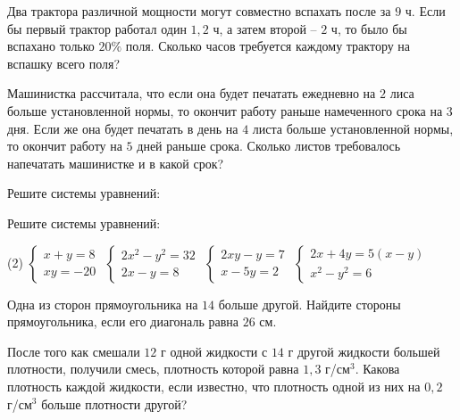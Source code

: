 \begin{class}[number=6]
\begin{listofex}
		\item Два трактора различной мощности могут совместно вспахать после за \(9\) ч. Если бы первый трактор работал один \(1,2\) ч, а затем второй -- \(2\) ч, то было бы вспахано только \(20\%\) поля. Сколько часов требуется каждому трактору на вспашку всего поля?
		\item Машинистка рассчитала, что если она будет печатать ежедневно на \(2\) лиса больше установленной нормы, то окончит работу раньше намеченного срока на \(3\) дня. Если же она будет печатать в день на \(4\) листа больше установленной нормы, то окончит работу на \(5\) дней раньше срока. Сколько листов требовалось напечатать машинистке и в какой срок?
	\end{listofex}
\end{class}

\begin{homework}[number=3]
	\begin{listofex}
		\item Решите системы уравнений:
		\begin{itasks}[2]
			\task {}
			\task {}
			\task {}
			\task {}
		\end{itasks}
		\item Решите системы уравнений:
		\begin{tasks}(2)
			\task \( \left\{
			\begin{array}{l}
				x+y=8\\
				xy=-20
			\end{array}
			\right. \)
			\task \( \left\{
			\begin{array}{l}
				2x^2-y^2=32\\
				2x-y=8
			\end{array}
			\right. \)
			\task \( \left\{
			\begin{array}{l}
				2xy-y=7\\
				x-5y=2
			\end{array}
			\right. \)
			\task \( \left\{
			\begin{array}{l}
				2x+4y=5(x-y)\\
				x^2-y^2=6
			\end{array}
			\right. \)
		\end{tasks}
		\item Одна из сторон прямоугольника на \( 14 \) больше другой. Найдите стороны прямоугольника, если его диагональ равна \( 26 \) см.
		\item После того как смешали \( 12 \) г одной жидкости с \( 14 \) г другой жидкости большей плотности, получили смесь, плотность которой равна \( 1,3 \) г/см\( ^3 \). Какова плотность каждой жидкости, если известно, что плотность одной из них на \( 0,2 \) г/см\( ^3 \) больше плотности другой?
	\end{listofex}
\end{homework}

